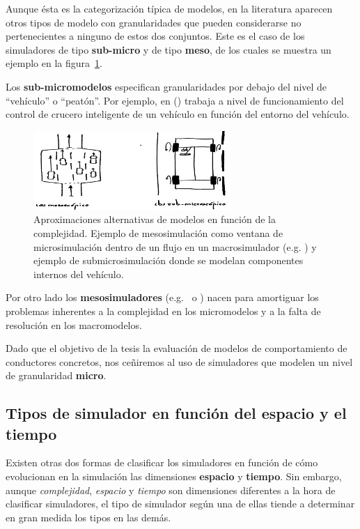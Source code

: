 Aunque ésta es la categorización típica de modelos, en la literatura aparecen otros tipos de modelo con granularidades que pueden considerarse no pertenecientes a ninguno de estos dos conjuntos. Este es el caso de los simuladores de tipo \textbf{sub-micro} y de tipo \textbf{meso}, de los cuales se muestra un ejemplo en la figura~\ref{fig:mesoscopic-and-submicroscopic-simulation}.

Los \textbf{sub-micromodelos} especifican granularidades por debajo del nivel de \enquote{vehículo} o \enquote{peatón}. Por ejemplo, en (\cite{Minderhoud1999}) trabaja a nivel de funcionamiento del control de crucero inteligente de un vehículo en función del entorno del vehículo.

\begin{figure}
	\centering
	\includegraphics{images/mesoscopic-and-submicroscopic-simulation}
	\caption{Aproximaciones alternativas de modelos en función de la complejidad. Ejemplo de mesosimulación como ventana de microsimulación dentro de un flujo en un macrosimulador (e.g. \cite{munoz2001integrated}) y ejemplo de submicrosimulación donde se modelan componentes internos del vehículo.}
	\label{fig:mesoscopic-and-submicroscopic-simulation}
\end{figure}

Por otro lado los \textbf{mesosimuladores} (e.g.~\cite{munoz2001integrated} o \cite{casas2011need}) nacen para amortiguar los problemas inherentes a la complejidad en los micromodelos y a la falta de resolución en los macromodelos.

Dado que el objetivo de la tesis la evaluación de modelos de comportamiento de conductores concretos, nos ceñiremos al uso de simuladores que modelen un nivel de granularidad \textbf{micro}.

\subsection{Tipos de simulador en función del espacio y el tiempo}

Existen otras dos formas de clasificar los simuladores en función de cómo evolucionan en la simulación las dimensiones \textbf{espacio} y  \textbf{tiempo}. Sin embargo, aunque \textit{complejidad}, \textit{espacio} y \textit{tiempo} son dimensiones diferentes a la hora de clasificar simuladores, el tipo de simulador según una de ellas tiende a determinar en gran medida los tipos en las demás.

